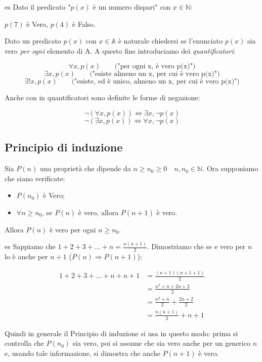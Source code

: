 \documentclass[x11names]{article}
\begin{document}
\begin{es}{es}
Dato il predicato "$p(x)$ è un numero dispari" con $x \in \mathbb{N}$:

$p(7)$ è Vero, $p(4)$ è Falso.
\end{es}

\vspace{0.7em}
\noindent
Dato un predicato $p(x)$ con $x \in \mathbb{A}$ è naturale chiedersi se l'enunciato $p(x)$ sia vero \textit{per ogni} elemento di A. A questo fine introduciamo dei \textit{quantificatori}:

\[
\forall x, p(x) \qquad \text{("per ogni x, è vero p(x)")}  
\]
\[
\exists x, p(x) \qquad \text{("esiste almeno un x, per cui è vero p(x)")}  
\]
\[
\exists !x, p(x) \qquad \text{("esiste, ed è unico, almeno un x, per cui è vero p(x)")}  
\]

\vspace{0.7em}
\noindent
Anche con in quantificatori sono definite le forme di negazione:

\[
\neg(\forall x, p(x)) \Longleftrightarrow \exists x, \neg p(x)  
\]
\[
\neg(\exists x, p(x)) \Longleftrightarrow \forall x, \neg p(x)
\]

\subsection{Principio di induzione}
Sia $P(n)$ una proprietà che dipende da $n \geq n_0 \geq 0 \quad n,n_0 \in \mathbb{N}$. Ora supponiamo che siano verificate:

\begin{itemize}
    \item $P(n_0)$ è Vero;
    \item $\forall n \geq n_0$, se $P(n)$ è vero, allora $P(n+1)$ è vero.
\end{itemize}

\noindent
Allora  $P(n)$ è vero per ogni $n \geq n_0$.

\begin{es}{es}
Sappiamo che $1+2+3+\dots+n = \frac{n(n+1)}{2}$. Dimostriamo che se e vero per $n$ lo è anche per $n+1$ ($P(n) \Rightarrow P(n+1)$):

\begin{align*}
1+2+3+\dots+n+n+1 & = \frac{(n+1)(n+1+1)}{2} \\ & = \frac{n^2 + n +2n + 2}{2} \\ & = \frac{n^2 + n}{2} + \frac{2n + 2}{2} \\ &=  \frac{n(n+1)}{2} + n+1 
\end{align*}

\end{es}
\vspace{0.7em}
\noindent
Quindi in generale il Principio di induzione si usa in questo modo: prima si controlla che $P(n_0)$ sia vero, poi si assume che sia vero anche per un generico $n$ e, usando tale informazione, si dimostra che anche $P(n+1)$ è vero.
\end{document}
